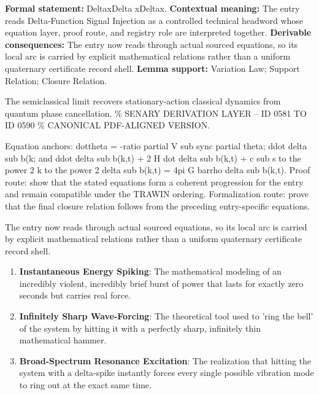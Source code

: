 \begingroup\footnotesize\setlength{\emergencystretch}{3em}\sloppy
\textbf{Formal statement:} DeltaxDelta xDeltax. \textbf{Contextual meaning:} The entry reads Delta-Function Signal Injection as a controlled technical headword whose equation layer, proof route, and registry role are interpreted together. \textbf{Derivable consequences:} The entry now reads through actual sourced equations, so its local arc is carried by explicit mathematical relations rather than a uniform quaternary certificate record shell. \textbf{Lemma support:} Variation Law; Support Relation; Closure Relation.\par
\endgroup

The semiclassical limit recovers stationary-action classical dynamics from quantum phase cancellation. \% SENARY DERIVATION LAYER -- ID 0581 TO ID 0590 \% CANONICAL PDF-ALIGNED VERSION.

Equation anchors: dottheta = -ratio partial V sub sync partial theta; ddot delta sub b(k; and ddot delta sub b(k,t) + 2 H dot delta sub b(k,t) + c sub s to the power 2 k to the power 2 delta sub b(k,t) = 4pi G barrho delta sub b(k,t). Proof route: show that the stated equations form a coherent progression for the entry and remain compatible under the TRAWIN ordering. Formalization route: prove that the final closure relation follows from the preceding entry-specific equations.

The entry now reads through actual sourced equations, so its local arc is carried by explicit mathematical relations rather than a uniform quaternary certificate record shell.
\endgroup

\begin{enumerate}[leftmargin=1.6em,itemsep=6pt,topsep=4pt]
\item \textbf{Instantaneous Energy Spiking}: The mathematical modeling of an incredibly violent, incredibly brief burst of power that lasts for exactly zero seconds but carries real force.
\item \textbf{Infinitely Sharp Wave-Forcing}: The theoretical tool used to 'ring the bell' of the system by hitting it with a perfectly sharp, infinitely thin mathematical hammer.
\item \textbf{Broad-Spectrum Resonance Excitation}: The realization that hitting the system with a delta-spike instantly forces every single possible vibration mode to ring out at the exact same time.
\end{enumerate}

